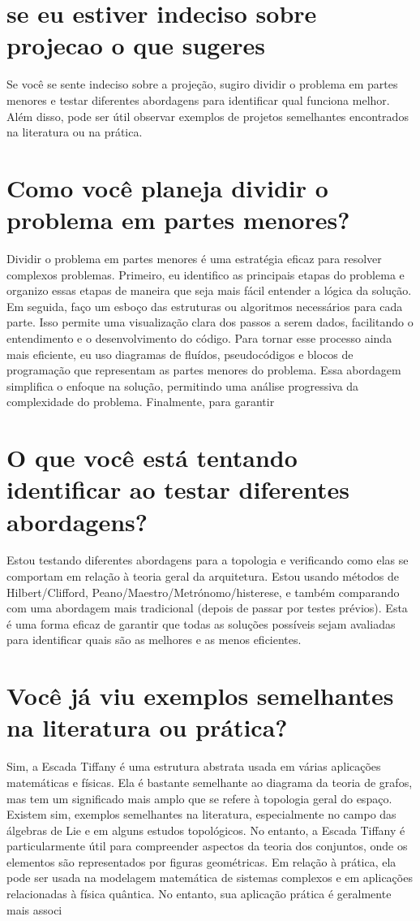 \documentclass[11pt,a4paper]{article}
\begin{document}
\section{se eu estiver indeciso sobre projecao o que sugeres}
Se você se sente indeciso sobre a projeção, sugiro dividir o problema em partes menores e testar diferentes abordagens para identificar qual funciona melhor. Além disso, pode ser útil observar exemplos de projetos semelhantes encontrados na literatura ou na prática.

\section{Como você planeja dividir o problema em partes menores?}
Dividir o problema em partes menores é uma estratégia eficaz para resolver complexos problemas. Primeiro, eu identifico as principais etapas do problema e organizo essas etapas de maneira que seja mais fácil entender a lógica da solução. Em seguida, faço um esboço das estruturas ou algoritmos necessários para cada parte. Isso permite uma visualização clara dos passos a serem dados, facilitando o entendimento e o desenvolvimento do código. Para tornar esse processo ainda mais eficiente, eu uso diagramas de fluídos, pseudocódigos e blocos de programação que representam as partes menores do problema. Essa abordagem simplifica o enfoque na solução, permitindo uma análise progressiva da complexidade do problema. Finalmente, para garantir

\section{O que você está tentando identificar ao testar diferentes abordagens?}
Estou testando diferentes abordagens para a topologia e verificando como elas se comportam em relação à teoria geral da arquitetura. Estou usando métodos de Hilbert/Clifford, Peano/Maestro/Metrónomo/histerese, e também comparando com uma abordagem mais tradicional (depois de passar por testes prévios). Esta é uma forma eficaz de garantir que todas as soluções possíveis sejam avaliadas para identificar quais são as melhores e as menos eficientes.

\section{Você já viu exemplos semelhantes na literatura ou prática?}
Sim, a Escada Tiffany é uma estrutura abstrata usada em várias aplicações matemáticas e físicas. Ela é bastante semelhante ao diagrama da teoria de grafos, mas tem um significado mais amplo que se refere à topologia geral do espaço. Existem sim, exemplos semelhantes na literatura, especialmente no campo das álgebras de Lie e em alguns estudos topológicos. No entanto, a Escada Tiffany é particularmente útil para compreender aspectos da teoria dos conjuntos, onde os elementos são representados por figuras geométricas. Em relação à prática, ela pode ser usada na modelagem matemática de sistemas complexos e em aplicações relacionadas à física quântica. No entanto, sua aplicação prática é geralmente mais associ
\end{document}
